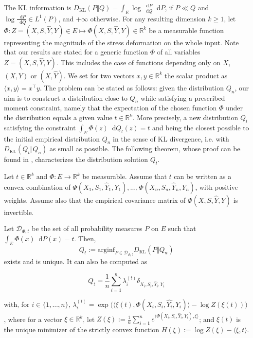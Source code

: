 \documentclass[runningheads, orivec]{llncs}
\newcommand{\KL}{D_{\mathrm{KL}}}
\newcommand{\dd}{\mathop{}\mathopen{}\mathrm{d}}
\begin{document}
The KL information is $\KL ( P \Vert Q )=\int_{E}\log\frac{\dd P}{\dd Q}\dd P$, if $P\ll Q$ and
$\log\frac{\dd P}{\dd Q}\in L^1(P)$, and $+\infty$ otherwise. For any resulting dimension $k \geq 1$, let
$\Phi: Z = (X,S, \widehat{Y},Y) \in E \mapsto \Phi(X,S,\widehat{Y},Y) \in \mathbb{R}^k$
be a measurable function representing the magnitude of the stress deformation on the whole input.
Note that our results are stated for a generic function $\Phi$ of all variables $Z=(X,S,\widehat{Y},Y)$. This includes the case of functions depending only on $X$, $(X,Y)$ or $(X,\widehat{Y})$. 
We set for two vectors $x,y \in \mathbb{R}^k$ the scalar product as $\langle x,y \rangle=x^\top y$. The problem can be stated as follows: given the distribution $Q_n$, our aim is to construct a distribution close to $Q_n$ while satisfying a prescribed moment constraint, namely that the expectation of the chosen function $\Phi$ under the distribution equals a given value $t \in \mathbb{R}^k$. More precisely, a new distribution $Q_{t}$ satisfying the constraint $\int_{E} \Phi(z) \dd Q_t(z) = t$ and being the closest possible to the initial empirical distribution $Q_n$ in the sense of KL divergence, i.e. with $\KL ( Q_t \Vert Q_n )$ as small as possible. The following theorem, whose proof can be found in \cite{gems}, characterizes the distribution solution $Q_t$. 
\begin{theorem} \label{thm:discrete:reweigth:multidim}
	Let $t \in \mathbb{R}^k$ and $\Phi : E \to \mathbb{R}^k$ be measurable.
	Assume that $t$ can be written as a convex combination of $\Phi(X_1,S_1, \widehat{Y}_1,Y_1) , \ldots , \Phi(X_n,S_n, \widehat{Y}_n,Y_n)$, with positive weights. Assume also that the empirical covariance matrix of $\Phi(X,S,\hat{Y}, Y)$ is invertible.

	Let $\mathcal{D}_{\Phi,t}$ be the set of all probability measures $P$ on $E$ such that $
	\int_{E} \Phi(x) \dd P(x)=t$.
		Then, \begin{equation} \label{thesol:Qn}
Q_t:=\mathrm{arginf}_{P\in\mathcal{D}_{\Phi,t}}\KL(P \Vert Q_n)
\end{equation}
    exists and is unique. It can also be computed as 

        \begin{equation}
            Q_t=
		\frac{1}{n}
		\sum_{i=1}^n
		\lambda_i^{(t)}
		\delta_{X_i , S_i, \widehat{Y}_i , Y_i}
        \end{equation}
        
        with, for $i\in\{1,\ldots,n\}$,
	$\lambda^{(t)}_i
		= \exp
		\bigg( \langle\xi(t) ,  \Phi(X_i,S_i, \widehat{Y_i},Y_i) \rangle - \log Z(\xi(t))
		\bigg)$, where for a  vector $\xi \in \mathbb{R}^k$, let $Z(\xi):=\frac{1}{n} \sum_{i=1}^n e^{\langle  \Phi(X_i,S_i, \widehat{Y}_i,Y_i) , \xi \rangle}$; and $\xi(t)$ is the unique minimizer of the strictly convex function
	$H(\xi):=\log Z(\xi)-\langle\xi,t\rangle$.
\end{theorem}
\end{document}
